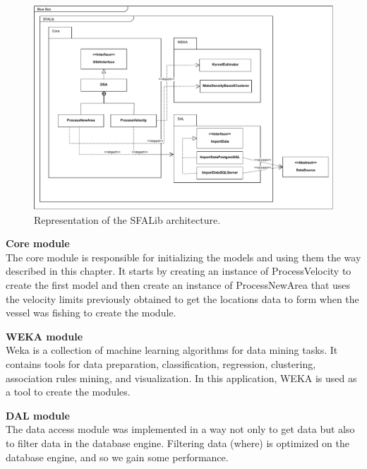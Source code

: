 \begin{figure}[h]
\centering
\includegraphics[width=1.0\linewidth]{Chapters/img/SFALib_Prof.pdf}
\caption{Representation of the SFALib architecture.}
\label{fig:SFALib_Prof}
\end{figure}



\textbf{Core module} \\The core module is responsible for initializing the models and using them the way described in this chapter. It starts by creating an instance of ProcessVelocity to create the first model and then create an instance of ProcessNewArea that uses the velocity limits previously obtained to get the locations data to form when the vessel was fishing to create the module.

\textbf{WEKA module} \\Weka is a collection of machine learning algorithms for data mining tasks. It contains tools for data preparation, classification, regression, clustering, association rules mining, and visualization. In this application, WEKA is used as a tool to create the modules.

\textbf{DAL module} \\The data access module was implemented in a way not only to get data but also to filter data in the database engine. Filtering data (where) is optimized on the database engine, and so we gain some performance.




